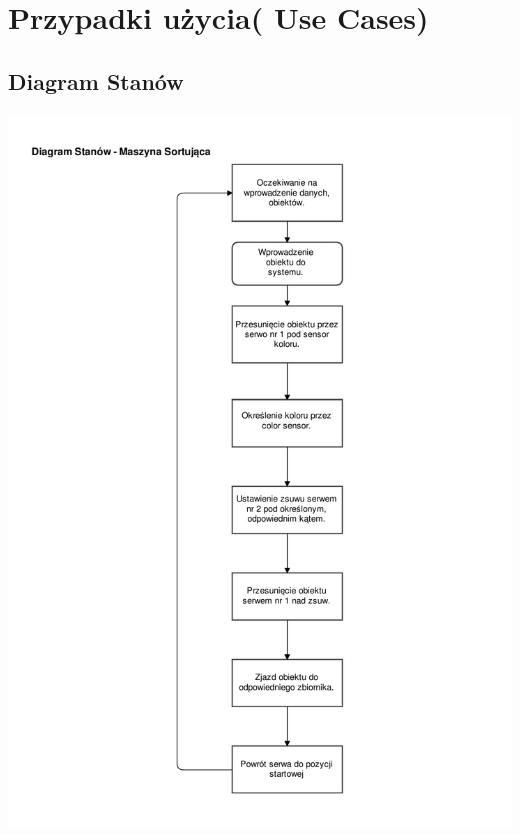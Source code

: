 \documentclass[12pt]{article}
\begin{document}
\section{Przypadki użycia( Use Cases)}
\subsection{Diagram Stanów}
\begin{minipage}[H]{.45\textwidth}
\centering
    \includegraphics[height=2.8\linewidth]{diagram_stanow.pdf}
\end{minipage}
\end{document}
